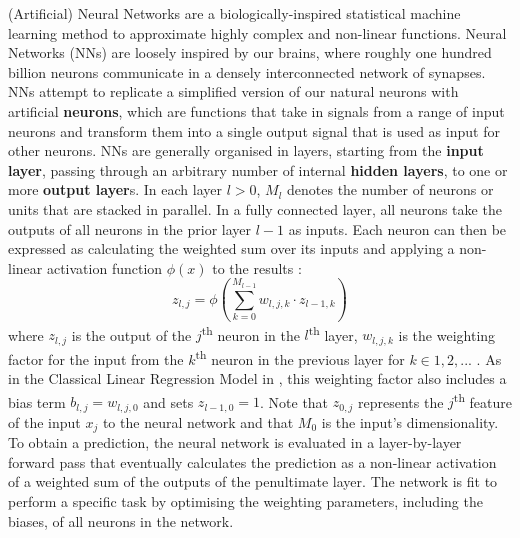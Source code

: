 (Artificial) Neural Networks are a biologically-inspired statistical machine learning method to approximate highly complex and non-linear functions. Neural Networks (NNs) are loosely inspired by our brains, where roughly one hundred billion neurons \cite{machine-learning-1997} communicate in a densely interconnected network of synapses. NNs attempt to replicate a simplified version of our natural neurons with artificial \textbf{neurons}, which are functions that take in signals from a range of input neurons and transform them into a single output signal that is used as input for other neurons. NNs are generally organised in layers, starting from the \textbf{input layer}, passing through an arbitrary number of internal \textbf{hidden layers}, to one or more \textbf{output layer}s. In each layer $l > 0$, $M_l$ denotes the number of neurons or units that are stacked in parallel. In a fully connected layer, all neurons take the outputs of all neurons in the prior layer $l-1$ as inputs. Each neuron can then be expressed as calculating the weighted sum over its inputs and applying a non-linear activation function $\phi(x)$ to the results \cite{rio-2019}:
\begin{equation*}
    z_{l, j} = \phi \left( \sum_{k=0}^{M_{l-1}}{w_{l,j,k} \cdot z_{l-1,k}} \right)
\end{equation*}
where $z_{l, j}$ is the output of the $j$\textsuperscript{th} neuron in the $l$\textsuperscript{th} layer, $w_{l,j,k}$ is the weighting factor for the input from the $k$\textsuperscript{th} neuron in the previous layer for $k \in 1, 2, ...$ . As in the Classical Linear Regression Model in , this weighting factor also includes a bias term $b_{l,j} = w_{l,j,0}$ and sets $z_{l-1,0} = 1$. Note that $z_{0, j}$ represents the $j$\textsuperscript{th} feature of the input $x_j$ to the neural network and that $M_0$ is the input's dimensionality. To obtain a prediction, the neural network is evaluated in a layer-by-layer forward pass that eventually calculates the prediction as a non-linear activation of a weighted sum of the outputs of the penultimate layer. The network is fit to perform a specific task by optimising the weighting parameters, including the biases, of all neurons in the network.

